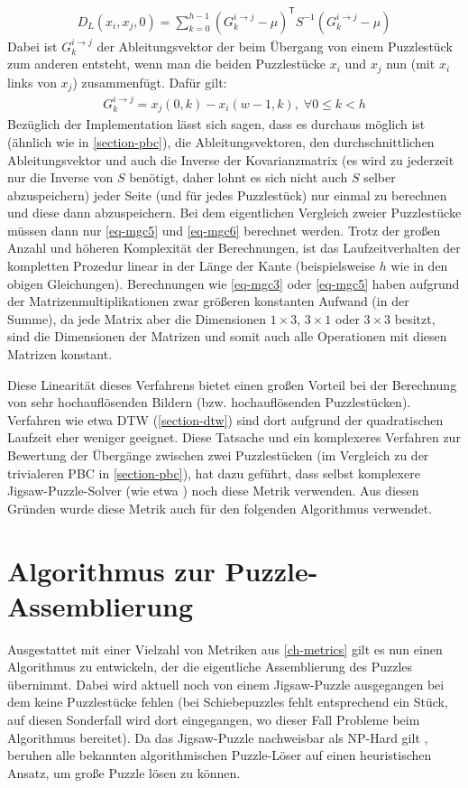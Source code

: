 \documentclass{whswinvcbook}
\begin{document}
\begin{align}\label{eq-mgc5}
    D_L(x_i,x_j,0)=\sum_{k=0}^{h-1}(G_k^{i\rightarrow j}-\mu)^\mathsf{T}S^{-1}(G_k^{i\rightarrow j}-\mu)
\end{align}
Dabei ist $G_k^{i\rightarrow j}$ der Ableitungsvektor der beim Übergang von einem Puzzlestück zum anderen entsteht, wenn man die beiden Puzzlestücke $x_i$ und $x_j$ nun (mit $x_i$ links von $x_j$) zusammenfügt. Dafür gilt:
\begin{align}\label{eq-mgc6}
    G_k^{i\rightarrow j}=x_j(0,k)-x_i(w-1,k),\;\forall 0\leq k<h
\end{align}
Bezüglich der Implementation lässt sich sagen, dass es durchaus möglich ist (ähnlich wie in \ref{section-pbc}), die Ableitungsvektoren, den durchschnittlichen Ableitungsvektor und auch die Inverse der Kovarianzmatrix (es wird zu jederzeit nur die Inverse von $S$ benötigt, daher lohnt es sich nicht auch $S$ selber abzuspeichern) jeder Seite (und für jedes Puzzlestück) nur einmal zu berechnen und diese dann abzuspeichern. Bei dem eigentlichen Vergleich zweier Puzzlestücke müssen dann nur \ref{eq-mgc5} und \ref{eq-mgc6} berechnet werden. Trotz der großen Anzahl und höheren Komplexität der Berechnungen, ist das Laufzeitverhalten der kompletten Prozedur linear in der Länge der Kante (beispielsweise $h$ wie in den obigen Gleichungen). Berechnungen wie \ref{eq-mgc3} oder \ref{eq-mgc5} haben aufgrund der Matrizenmultiplikationen zwar größeren konstanten Aufwand (in der Summe), da jede Matrix aber die Dimensionen $1\times3$, $3\times1$ oder $3\times3$ besitzt, sind die Dimensionen der Matrizen und somit auch alle Operationen mit diesen Matrizen konstant.

Diese Linearität dieses Verfahrens bietet einen großen Vorteil bei der Berechnung von sehr hochauflösenden Bildern (bzw. hochauflösenden Puzzlestücken). Verfahren wie etwa DTW (\ref{section-dtw}) sind dort aufgrund der quadratischen Laufzeit eher weniger geeignet. Diese Tatsache und ein komplexeres Verfahren zur Bewertung der Übergänge zwischen zwei Puzzlestücken (im Vergleich zu der trivialeren PBC in \ref{section-pbc}), hat dazu geführt, dass selbst komplexere Jigsaw-Puzzle-Solver (wie etwa \cite{paikin}) noch diese Metrik verwenden. Aus diesen Gründen wurde diese Metrik auch für den folgenden Algorithmus verwendet.
\chapter{Algorithmus zur Puzzle-Assemblierung}
Ausgestattet mit einer Vielzahl von Metriken aus \ref{ch-metrics} gilt es nun einen Algorithmus zu entwickeln, der die eigentliche Assemblierung des Puzzles übernimmt. Dabei wird aktuell noch von einem Jigsaw-Puzzle ausgegangen bei dem keine Puzzlestücke fehlen (bei Schiebepuzzles fehlt entsprechend ein Stück, auf diesen Sonderfall wird dort eingegangen, wo dieser Fall Probleme beim Algorithmus bereitet). Da das Jigsaw-Puzzle nachweisbar als NP-Hard gilt \cite{dem}, beruhen alle bekannten algorithmischen Puzzle-Löser auf einen heuristischen Ansatz, um große Puzzle lösen zu können.
\end{document}
